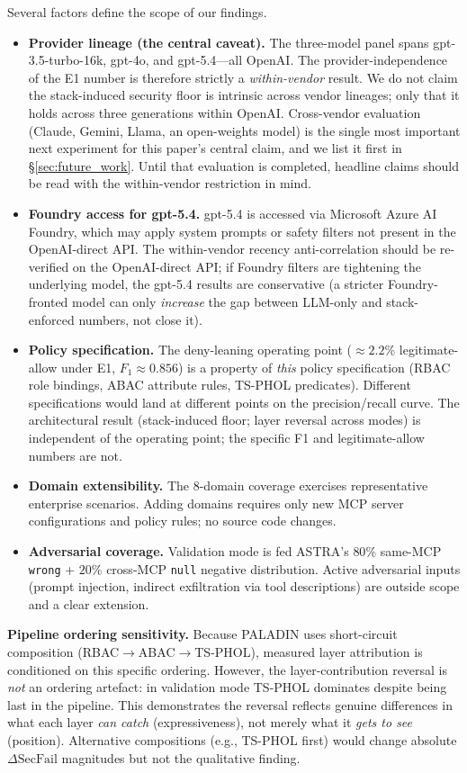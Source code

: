 \documentclass[10pt,a4paper,twocolumn]{article}
\begin{document}
Several factors define the scope of our findings.
\begin{itemize}
  \item \textbf{Provider lineage (the central caveat).} The three-model panel spans gpt-3.5-turbo-16k, gpt-4o, and gpt-5.4---all OpenAI. The provider-independence of the E1 number is therefore strictly a \emph{within-vendor} result. We do not claim the stack-induced security floor is intrinsic across vendor lineages; only that it holds across three generations within OpenAI. Cross-vendor evaluation (Claude, Gemini, Llama, an open-weights model) is the single most important next experiment for this paper's central claim, and we list it first in \S\ref{sec:future_work}. Until that evaluation is completed, headline claims should be read with the within-vendor restriction in mind.
  \item \textbf{Foundry access for gpt-5.4.} gpt-5.4 is accessed via Microsoft Azure AI Foundry, which may apply system prompts or safety filters not present in the OpenAI-direct API. The within-vendor recency anti-correlation should be re-verified on the OpenAI-direct API; if Foundry filters are tightening the underlying model, the gpt-5.4 results are conservative (a stricter Foundry-fronted model can only \emph{increase} the gap between LLM-only and stack-enforced numbers, not close it).
  \item \textbf{Policy specification.} The deny-leaning operating point ($\approx 2.2\%$ legitimate-allow under E1, $F_1 \approx 0.856$) is a property of \emph{this} policy specification (RBAC role bindings, ABAC attribute rules, TS-PHOL predicates). Different specifications would land at different points on the precision/recall curve. The architectural result (stack-induced floor; layer reversal across modes) is independent of the operating point; the specific F1 and legitimate-allow numbers are not.
  \item \textbf{Domain extensibility.} The 8-domain coverage exercises representative enterprise scenarios. Adding domains requires only new MCP server configurations and policy rules; no source code changes.
  \item \textbf{Adversarial coverage.} Validation mode is fed ASTRA's $80\%$ same-MCP \texttt{wrong} + $20\%$ cross-MCP \texttt{null} negative distribution. Active adversarial inputs (prompt injection, indirect exfiltration via tool descriptions) are outside scope and a clear extension.
\end{itemize}

\textbf{Pipeline ordering sensitivity.} Because PALADIN uses short-circuit composition (RBAC$\to$ABAC$\to$TS-PHOL), measured layer attribution is conditioned on this specific ordering. However, the layer-contribution reversal is \emph{not} an ordering artefact: in validation mode TS-PHOL dominates despite being last in the pipeline. This demonstrates the reversal reflects genuine differences in what each layer \emph{can catch} (expressiveness), not merely what it \emph{gets to see} (position). Alternative compositions (e.g., TS-PHOL first) would change absolute $\Delta\mathrm{SecFail}$ magnitudes but not the qualitative finding.
\end{document}
